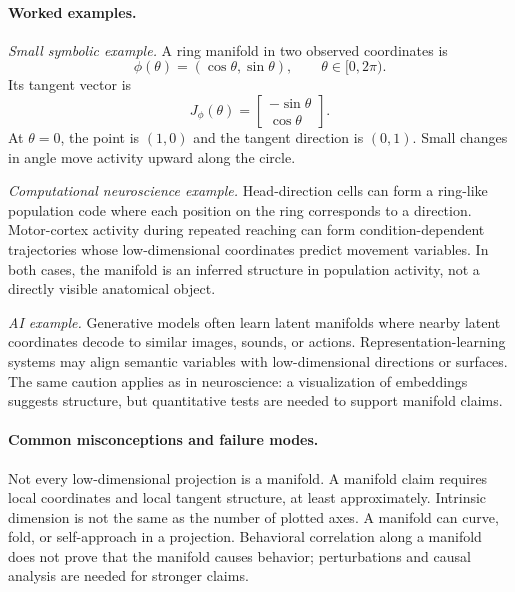 \paragraph{Worked examples.}
\emph{Small symbolic example.}
A ring manifold in two observed coordinates is
\[
\phi(\theta)=(\cos\theta,\sin\theta),
\qquad \theta\in[0,2\pi).
\]
Its tangent vector is
\[
J_\phi(\theta)=
\begin{bmatrix}
-\sin\theta\\
\cos\theta
\end{bmatrix}.
\]
At \(\theta=0\), the point is \((1,0)\) and the tangent direction is \((0,1)\). Small changes in angle move activity upward along the circle.

\emph{Computational neuroscience example.}
Head-direction cells can form a ring-like population code where each position on the ring corresponds to a direction. Motor-cortex activity during repeated reaching can form condition-dependent trajectories whose low-dimensional coordinates predict movement variables. In both cases, the manifold is an inferred structure in population activity, not a directly visible anatomical object.

\emph{AI example.}
Generative models often learn latent manifolds where nearby latent coordinates decode to similar images, sounds, or actions. Representation-learning systems may align semantic variables with low-dimensional directions or surfaces. The same caution applies as in neuroscience: a visualization of embeddings suggests structure, but quantitative tests are needed to support manifold claims.

\paragraph{Common misconceptions and failure modes.}
Not every low-dimensional projection is a manifold. A manifold claim requires local coordinates and local tangent structure, at least approximately. Intrinsic dimension is not the same as the number of plotted axes. A manifold can curve, fold, or self-approach in a projection. Behavioral correlation along a manifold does not prove that the manifold causes behavior; perturbations and causal analysis are needed for stronger claims.

